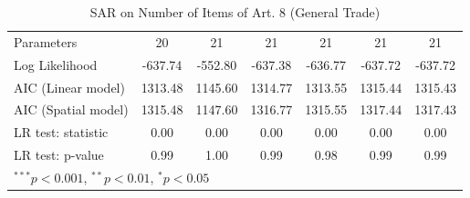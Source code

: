 \begin{table}[!h]
\begin{center}
\begin{tabular}{l c c c c c c }
Parameters              & 20           & 21           & 21           & 21           & 21           & 21           \\
Log Likelihood          & -637.74      & -552.80      & -637.38      & -636.77      & -637.72      & -637.72      \\
AIC (Linear model)      & 1313.48      & 1145.60      & 1314.77      & 1313.55      & 1315.44      & 1315.43      \\
AIC (Spatial model)     & 1315.48      & 1147.60      & 1316.77      & 1315.55      & 1317.44      & 1317.43      \\
LR test: statistic      & 0.00         & 0.00         & 0.00         & 0.00         & 0.00         & 0.00         \\
LR test: p-value        & 0.99         & 1.00         & 0.99         & 0.98         & 0.99         & 0.99         \\
\bottomrule
\multicolumn{7}{l}{\scriptsize{$^{***}p<0.001$, $^{**}p<0.01$, $^*p<0.05$}}
\end{tabular}
\caption{SAR on Number of Items of Art. 8 (General Trade)}
\label{table:coefficients}
\end{center}
\end{table}

